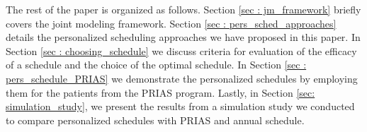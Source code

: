 The rest of the paper is organized as follows. Section \ref{sec : jm_framework} briefly covers the joint modeling framework. Section \ref{sec : pers_sched_approaches} details the personalized scheduling approaches we have proposed in this paper. In Section \ref{sec : choosing_schedule} we discuss criteria for evaluation of the efficacy of a schedule and the choice of the optimal schedule. In Section \ref{sec : pers_schedule_PRIAS} we demonstrate the personalized schedules by employing them for the patients from the PRIAS program. Lastly, in Section \ref{sec: simulation_study}, we present the results from a simulation study we conducted to compare personalized schedules with PRIAS and annual schedule.